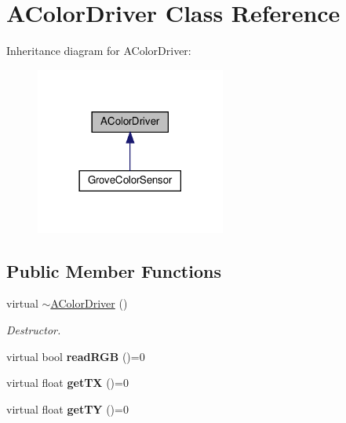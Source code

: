 \hypertarget{classAColorDriver}{}\section{A\+Color\+Driver Class Reference}
\label{classAColorDriver}


Inheritance diagram for A\+Color\+Driver\+:
\nopagebreak
\begin{figure}[H]
\begin{center}
\leavevmode
\includegraphics[width=177pt]{classAColorDriver__inherit__graph}
\end{center}
\end{figure}
\subsection*{Public Member Functions}
\begin{DoxyCompactItemize}
\item 
\mbox{\label{classAColorDriver_aa44565ec7bdfbfdaf504bd1492d7021b}} 
virtual \hyperlink{classAColorDriver_aa44565ec7bdfbfdaf504bd1492d7021b}{$\sim$\+A\+Color\+Driver} ()
\begin{DoxyCompactList}\small\item\em Destructor. \end{DoxyCompactList}\item 
\mbox{\label{classAColorDriver_a4b1874012a07a2e9d38ed5c25fc85dd5}} 
virtual bool {\bfseries read\+R\+GB} ()=0
\item 
\mbox{\label{classAColorDriver_ade70c9866d17065d51adc23cf8d84711}} 
virtual float {\bfseries get\+TX} ()=0
\item 
\mbox{\label{classAColorDriver_aee75d3eab0612cc3a78053e15f50e47a}} 
virtual float {\bfseries get\+TY} ()=0
\end{DoxyCompactItemize}
